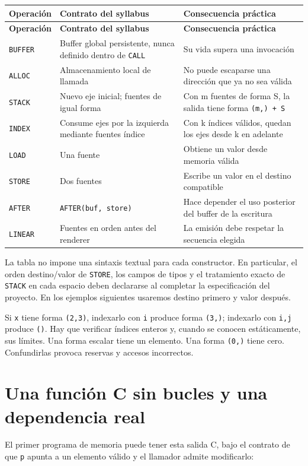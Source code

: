 \documentclass[12pt,a4paper,oneside]{report}
\begin{document}
{\small
\begin{longtable}{@{}P{0.28\textwidth}P{0.32\textwidth}P{0.34\textwidth}@{}}
\toprule
\textbf{Operación} & \textbf{Contrato del syllabus} & \textbf{Consecuencia práctica}\\
\midrule
\endfirsthead
\toprule
\textbf{Operación} & \textbf{Contrato del syllabus} & \textbf{Consecuencia práctica}\\
\midrule
\endhead
\texttt{BUFFER} & Buffer global persistente, nunca definido dentro de \texttt{CALL} & Su vida supera una invocación\\
\texttt{ALLOC} & Almacenamiento local de llamada & No puede escaparse una dirección que ya no sea válida\\
\texttt{STACK} & Nuevo eje inicial; fuentes de igual forma & Con m fuentes de forma S, la salida tiene forma \texttt{(m,) + S}\\
\texttt{INDEX} & Consume ejes por la izquierda mediante fuentes índice & Con k índices válidos, quedan los ejes desde k en adelante\\
\texttt{LOAD} & Una fuente & Obtiene un valor desde memoria válida\\
\texttt{STORE} & Dos fuentes & Escribe un valor en el destino compatible\\
\texttt{AFTER} & \texttt{AFTER(buf, store)} & Hace depender el uso posterior del buffer de la escritura\\
\texttt{LINEAR} & Fuentes en orden antes del renderer & La emisión debe respetar la secuencia elegida\\
\bottomrule
\end{longtable}
}
La tabla no impone una sintaxis textual para cada constructor. En particular, el orden destino/valor de \texttt{STORE}, los campos de tipos y el tratamiento exacto de \texttt{STACK} en cada espacio deben declararse al completar la especificación del proyecto. En los ejemplos siguientes usaremos destino primero y valor después.

Si \texttt{x} tiene forma \texttt{(2,3)}, indexarlo con \texttt{i} produce forma \texttt{(3,)}; indexarlo con \texttt{i,j} produce \texttt{()}. Hay que verificar índices enteros y, cuando se conocen estáticamente, sus límites. Una forma escalar tiene un elemento. Una forma \texttt{(0,)} tiene cero. Confundirlas provoca reservas y accesos incorrectos.

\section{Una función C sin bucles y una dependencia real}
El primer programa de memoria puede tener esta salida C, bajo el contrato de que \texttt{p} apunta a un elemento válido y el llamador admite modificarlo:
\end{document}
